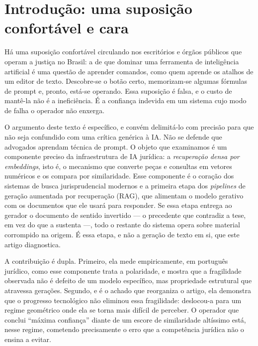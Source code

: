 \documentclass[11pt]{article}
\begin{document}
\section{Introdução: uma suposição confortável e cara}

Há uma suposição confortável circulando nos escritórios e órgãos públicos que
operam a justiça no Brasil: a de que dominar uma ferramenta de inteligência
artificial é uma questão de aprender comandos, como quem aprende os atalhos de
um editor de texto. Descobre-se o botão certo, memorizam-se algumas fórmulas de
prompt e, pronto, está-se operando. Essa suposição é falsa, e o custo de
mantê-la não é a ineficiência. É a confiança indevida em um sistema cujo modo de
falha o operador não enxerga.

O argumento deste texto é específico, e convém delimitá-lo com precisão para que
não seja confundido com uma crítica genérica à IA. Não se defende que advogados
aprendam técnica de prompt. O objeto que examinamos é um componente preciso da
infraestrutura de IA jurídica: a \emph{recuperação densa por
\textit{embeddings}}, isto é, o mecanismo que converte peças e consultas em
vetores numéricos e os compara por similaridade. Esse componente é o coração dos
sistemas de busca jurisprudencial modernos e a primeira etapa dos
\textit{pipelines} de geração aumentada por recuperação (RAG), que alimentam o
modelo gerativo com os documentos que ele usará para responder. Se essa etapa
entrega ao gerador o documento de sentido invertido --- o precedente que
contradiz a tese, em vez do que a sustenta ---, todo o restante do sistema opera
sobre material corrompido na origem. É essa etapa, e não a geração de texto em si,
que este artigo diagnostica.

A contribuição é dupla. Primeiro, ela mede empiricamente, em português jurídico,
como esse componente trata a polaridade, e mostra que a fragilidade observada não
é defeito de um modelo específico, mas propriedade estrutural que atravessa
gerações. Segundo, e é o achado que reorganiza o artigo, ela demonstra que o
progresso tecnológico não eliminou essa fragilidade: deslocou-a para um regime
geométrico onde ela se torna mais difícil de perceber. O operador que conclui
``máxima confiança'' diante de um escore de similaridade altíssimo está, nesse
regime, cometendo precisamente o erro que a competência jurídica não o ensina a
evitar.

\end{document}
